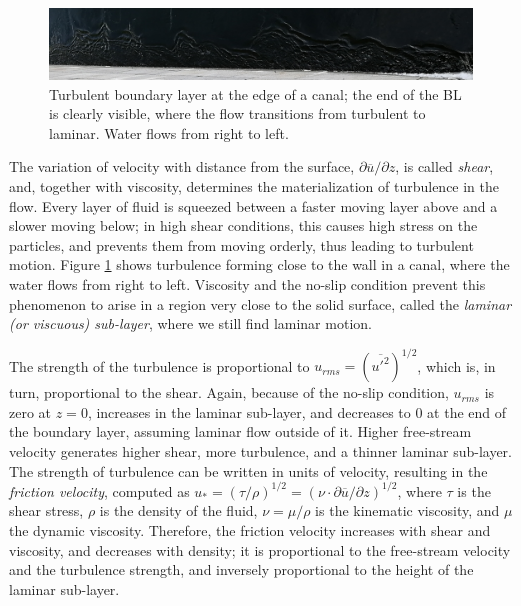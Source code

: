 \documentclass[12pt]{book}
\begin{document}
\begin{figure}
\caption{Turbulent boundary layer at the edge of a canal; the end of the BL is clearly visible, where the flow transitions from turbulent to laminar. Water flows from right to left.}
\label{fig:bl}
\centering
\includegraphics[width=\textwidth]{images/bl}
\end{figure}

The variation of velocity with distance from the surface, $\partial\overline{u}/\partial z$, is called \emph{shear}, and, together with viscosity, determines the materialization of turbulence in the flow. Every layer of fluid is squeezed between a faster moving layer above and a slower moving below; in high shear conditions, this causes high stress on the particles, and prevents them from moving orderly, thus leading to turbulent motion. Figure \ref{fig:bl} shows turbulence forming close to the wall in a canal, where the water flows from right to left. Viscosity and the no-slip condition prevent this phenomenon to arise in a region very close to the solid surface, called the \emph{laminar (or viscuous) sub-layer}, where we still find laminar motion.

The strength of the turbulence is proportional to $u_{rms}=(\overline{u'^2})^{1/2}$, which is, in turn, proportional to the shear. Again, because of the no-slip condition, $u_{rms}$ is zero at $z=0$, increases in the laminar sub-layer, and decreases to 0 at the end of the boundary layer, assuming laminar flow outside of it. Higher free-stream velocity generates higher shear, more turbulence, and a thinner laminar sub-layer. The strength of turbulence can be written in units of velocity, resulting in the \emph{friction velocity}, computed as $u_*=(\tau/\rho)^{1/2}=(\nu\cdot\partial\overline{u}/\partial z)^{1/2}$, where $\tau$ is the shear stress, $\rho$ is the density of the fluid, $\nu=\mu/\rho$ is the kinematic viscosity, and $\mu$ the dynamic viscosity. Therefore, the friction velocity increases with shear and viscosity, and decreases with density; it is proportional to the free-stream velocity and the turbulence strength, and inversely proportional to the height of the laminar sub-layer.
\end{document}
